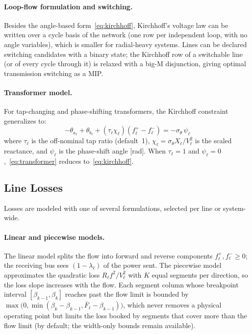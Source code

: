 \paragraph{Loop-flow formulation and switching.}
Besides the angle-based form~\eqref{eq:kirchhoff}, Kirchhoff's voltage
law can be written over a cycle basis of the network (one row per
independent loop, with no angle variables), which is smaller for
radial-heavy systems.  Lines can be declared switching candidates with a
binary state; the Kirchhoff row of a switchable line (or of every cycle
through it) is relaxed with a big-M disjunction, giving optimal
transmission switching as a MIP.

\paragraph{Transformer model.}
For tap-changing and phase-shifting transformers, the Kirchhoff
constraint generalizes to:
\begin{equation}
\label{eq:transformer}
-\theta_{a_\ell} + \theta_{b_\ell}
  + (\tau_\ell \chi_\ell)(f^+_\ell - f^-_\ell)
  = -\sigma_\theta \, \psi_{\ell}
\end{equation}
where $\tau_\ell$ is the off-nominal tap ratio (default~1),
$\chi_\ell = \sigma_\theta X_\ell / V_\ell^2$ is the scaled reactance,
and $\psi_\ell$ is the phase-shift angle [rad].
When $\tau_\ell = 1$ and $\psi_\ell = 0$,~\eqref{eq:transformer}
reduces to~\eqref{eq:kirchhoff}.

\subsection{Line Losses}
\label{sec:losses}

Losses are modeled with one of several formulations, selected per line
or system-wide.

\paragraph{Linear and piecewise models.}
The linear model splits the flow into forward and reverse components
$f^+_\ell, f^-_\ell \geq 0$; the receiving bus sees
$(1-\lambda_\ell)$ of the power sent.  The piecewise model approximates
the quadratic loss $R_\ell f^2 / V_\ell^2$ with $K$ equal segments per
direction, so the loss slope increases with the flow.  Each segment
column whose breakpoint interval $[\beta_{k-1}, \beta_k]$ reaches past
the flow limit is bounded by
$\max\bigl(0, \min(\beta_k - \beta_{k-1}, \overline{F}_\ell -
\beta_{k-1})\bigr)$, which never removes a physical operating point but
limits the loss booked by segments that cover more than the flow limit
(by default; the width-only bounds remain available).

